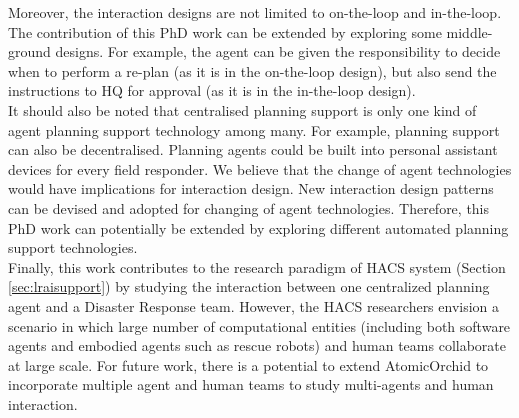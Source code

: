 Moreover, the interaction designs are not limited to on-the-loop and in-the-loop. The contribution of this PhD work can be extended by exploring some middle-ground designs. For example, the agent can be given the responsibility to decide when to perform a re-plan (as it is in the on-the-loop design), but also send the instructions to HQ for approval (as it is in the in-the-loop design).\\

It should also be noted that centralised planning support is only one kind of agent planning support technology among many. For example, planning support can also be decentralised. Planning agents could be built into personal assistant devices for every field responder. We believe that the change of agent technologies would have implications for interaction design. New interaction design patterns can be devised and adopted for changing of agent technologies. Therefore, this PhD work can potentially be extended by exploring different automated planning support technologies.\\ 

Finally, this work contributes to the research paradigm of \acf{HACS} system (Section \ref{sec:lraisupport}) by studying the interaction between one centralized planning agent and a Disaster Response team. However, the \ac{HACS} researchers envision a scenario in which large number of computational entities (including both software agents and embodied agents such as rescue robots) and human teams collaborate at large scale. For future work, there is a potential to extend AtomicOrchid to incorporate multiple agent and human teams to study multi-agents and human interaction.\\




